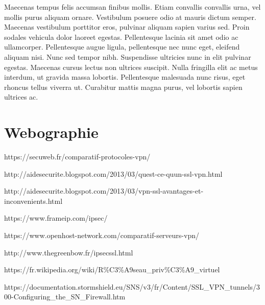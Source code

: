 \documentclass{report}
\begin{document}
Maecenas tempus felis accumsan finibus mollis. Etiam convallis convallis urna, vel mollis purus aliquam ornare. Vestibulum posuere odio at mauris dictum semper. Maecenas vestibulum porttitor eros, pulvinar aliquam sapien varius sed. Proin sodales vehicula dolor laoreet egestas. Pellentesque lacinia sit amet odio ac ullamcorper. Pellentesque augue ligula, pellentesque nec nunc eget, eleifend aliquam nisi. Nunc sed tempor nibh. Suspendisse ultricies nunc in elit pulvinar egestas. Maecenas cursus lectus non ultrices suscipit. Nulla fringilla elit ac metus interdum, ut gravida massa lobortis. Pellentesque malesuada nunc risus, eget rhoncus tellus viverra ut. Curabitur mattis magna purus, vel lobortis sapien ultrices ac.


\chapter{ Webographie}

https://secuweb.fr/comparatif-protocoles-vpn/

http://aidesecurite.blogspot.com/2013/03/quest-ce-quun-ssl-vpn.html

http://aidesecurite.blogspot.com/2013/03/vpn-ssl-avantages-et-inconvenients.html

https://www.frameip.com/ipsec/

https://www.openhost-network.com/comparatif-serveurs-vpn/

http://www.thegreenbow.fr/ipsecssl.html

https://fr.wikipedia.org/wiki/R\%C3\%A9seau\_priv\%C3\%A9\_virtuel

https://documentation.stormshield.eu/SNS/v3/fr/Content/SSL\_VPN\_tunnels/300-Configuring\_the\_SN\_Firewall.htm

\listoffigures



\glossaries
\end{document}
